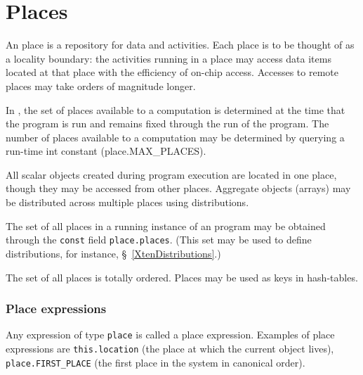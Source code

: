 \chapter{Places}\label{XtenPlaces}

An \Xten{} place is a repository for data and activities. Each place
is to be thought of as a locality boundary: the activities running in
a place may access data items located at that place with the
efficiency of on-chip access. Accesses to remote places may take
orders of magnitude longer.

In \XtenCurrVer{}, the set of places available to a computation is
determined at the time that the program is run and remains fixed
through the run of the program. The number of places available to a
computation may be determined by querying a run-time int constant
({\cf place.MAX\_PLACES}).

All scalar objects created during program execution are located in one
place, though they may be accessed from other places. Aggregate
objects (arrays) may be distributed across multiple places using
distributions.


The set of all places in a running instance of an \Xten{} program may
be obtained through the {\tt const} field {\tt place.places}.  (This
set may be used to define distributions, for instance,
\S~\ref{XtenDistributions}.)



The set of all places is totally ordered. Places may be used as keys
in hash-tables.

\subsection{Place expressions}
Any expression of type {\tt place} is called a place expression. 
Examples of place expressions are {\tt this.location} (the place
at which the current object lives), {\tt place.FIRST\_PLACE}
(the first place in the system in canonical order). 

